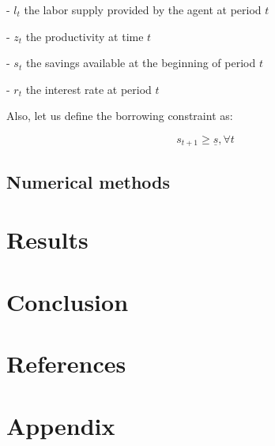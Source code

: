 \documentclass{article}
\begin{document}
-  $l_t$ the labor supply provided by the agent at period $t$

-  $z_t$ the productivity at time $t$

-  $s_{t}$ the savings available at the beginning of period $t$

-  $r_{t}$ the interest rate at period $t$

Also, let us define the borrowing constraint as: 

$$s_{t+1}\geq \underline{s}, \forall t$$

\subsection{Numerical methods}

\section{Results}

\section{Conclusion}

\section{References}

\section{Appendix}
\end{document}
